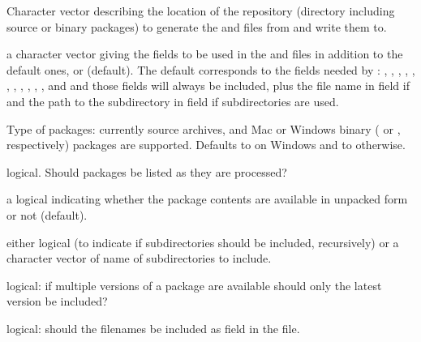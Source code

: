 \begin{Arguments}
\begin{ldescription}
\item[\code{dir}] Character vector describing the location of the repository
(directory including source or binary packages) to generate the
 and  files from and write them to.

\item[\code{fields}] 
a character vector giving the fields to be used in the
 and  files in addition to the
default ones, or  (default).  The default corresponds to
the fields needed by :
, , ,
, ,
, , ,
, , ,
and  and those fields will always be included, plus
the file name in field  if 
and the path to the subdirectory in field  if subdirectories
are used.

\item[\code{type}] 
Type of packages: currently source  archives, and Mac
or Windows binary ( or , respectively)
packages are supported.  Defaults to  on Windows
and to  otherwise.

\item[\code{verbose}] logical.  Should packages be listed as they are
processed?
\item[\code{unpacked}] a logical indicating whether the package contents are
available in unpacked form or not (default).
\item[\code{subdirs}] either logical (to indicate if subdirectories should be
included, recursively) or a character vector of name of subdirectories
to include.
\item[\code{latestOnly}] logical: if multiple versions of a package are
available should only the latest version be included?
\item[\code{addFiles}] logical: should the filenames be included as field
 in the  file.
\end{ldescription}
\end{Arguments}
%
